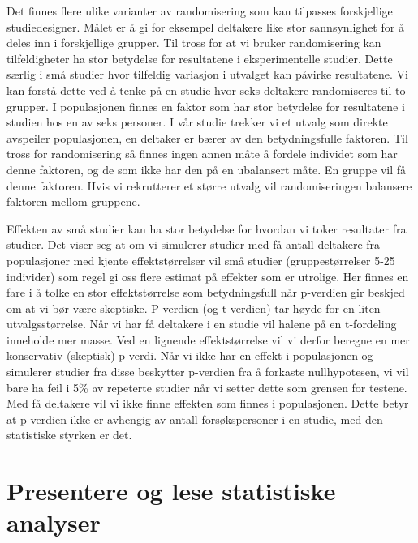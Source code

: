 \documentclass[
  letterpaper,
  DIV=11,
  numbers=noendperiod,
  oneside]{scrreprt}
\begin{document}
Det finnes flere ulike varianter av randomisering som kan tilpasses
forskjellige studiedesigner. Målet er å gi for eksempel deltakere like
stor sannsynlighet for å deles inn i forskjellige grupper. Til tross for
at vi bruker randomisering kan tilfeldigheter ha stor betydelse for
resultatene i eksperimentelle studier. Dette særlig i små studier hvor
tilfeldig variasjon i utvalget kan påvirke resultatene. Vi kan forstå
dette ved å tenke på en studie hvor seks deltakere randomiseres til to
grupper. I populasjonen finnes en faktor som har stor betydelse for
resultatene i studien hos en av seks personer. I vår studie trekker vi
et utvalg som direkte avspeiler populasjonen, en deltaker er bærer av
den betydningsfulle faktoren. Til tross for randomisering så finnes
ingen annen måte å fordele individet som har denne faktoren, og de som
ikke har den på en ubalansert måte. En gruppe vil få denne faktoren.
Hvis vi rekrutterer et større utvalg vil randomiseringen balansere
faktoren mellom gruppene.

Effekten av små studier kan ha stor betydelse for hvordan vi toker
resultater fra studier. Det viser seg at om vi simulerer studier med få
antall deltakere fra populasjoner med kjente effektstørrelser vil små
studier (gruppestørrelser 5-25 individer) som regel gi oss flere estimat
på effekter som er utrolige. Her finnes en fare i å tolke en stor
effektstørrelse som betydningsfull når p-verdien gir beskjed om at vi
bør være skeptiske. P-verdien (og t-verdien) tar høyde for en liten
utvalgsstørrelse. Når vi har få deltakere i en studie vil halene på en
t-fordeling inneholde mer masse. Ved en lignende effektstørrelse vil vi
derfor beregne en mer konservativ (skeptisk) p-verdi. Når vi ikke har en
effekt i populasjonen og simulerer studier fra disse beskytter p-verdien
fra å forkaste nullhypotesen, vi vil bare ha feil i 5\% av repeterte
studier når vi setter dette som grensen for testene. Med få deltakere
vil vi ikke finne effekten som finnes i populasjonen. Dette betyr at
p-verdien ikke er avhengig av antall forsøkspersoner i en studie, med
den statistiske styrken er det.

\hypertarget{section-1}{%
\chapter{}\label{section-1}}

\part{Presentere og lese statistiske analyser}
\end{document}
